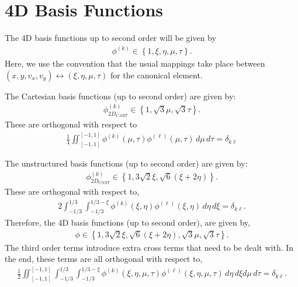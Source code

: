 \documentclass[12pt]{amsart}
\begin{document}
\title{}
\author{}
\date{}
\maketitle

\section{4D Basis Functions}

The 4D basis functions up to second order will be given by
\begin{align}
	\phi^{(k)} \in \left\{	1, \xi, \eta, \mu, \tau \right\}.
\end{align}
Here, we use the convention that the usual mappings take place between
$(x,y,v_x, v_y) \leftrightarrow (\xi, \eta, \mu, \tau )$ for the canonical element.

The Cartesian basis functions (up to second order) are given by:
\begin{align}
	\phi^{(k)}_{2D_{CART}} \in \left\{ 1, \sqrt{3} \mu,  \sqrt{3} \tau \right\}.
\end{align}
These are orthogonal with respect to
\begin{align}
	\frac{1}{4} \iint_{[-1,1]}^{[-1,1]} \phi^{(k)}(\mu,\tau) \phi^{(\ell)}(\mu,\tau)\, d\mu\, d\tau = \delta_{k\ell}
\end{align}

The unstructured basis functions (up to second order) are given by:
\begin{align}
	\phi^{(k)}_{2D_{UNST}} \in \left\{ 1, 3\sqrt{2}\xi, \sqrt{6}\left( \xi + 2\eta \right) \right\}.
\end{align}
These are orthogonal with respect to,
\begin{align}
	2 \int_{-1/3}^{1/3}\int_{-1/3}^{1/3-\xi} \phi^{(k)}(\xi,\eta) \phi^{(\ell)}(\xi,\eta)\, d\eta\, d\xi = \delta_{k\ell}.
\end{align}
Therefore, the 4D basis functions (up to second order), are given by,
\begin{align}
	\phi \in \left\{ 1, 3\sqrt{2}\xi, \sqrt{6}\left( \xi + 2\eta \right), 	 \sqrt{3} \mu,  \sqrt{3} \tau	\right\}.
\end{align}
The third order terms introduce extra cross terms that need to be dealt with.
In the end, these terms are all orthogonal with respect to,
\begin{align}
	\frac{1}{2} \iint_{[-1,1]}^{[-1,1]} \int_{-1/3}^{1/3}\int_{-1/3}^{1/3-\xi} \phi^{(k)}(\xi,\eta, \mu, \tau) \phi^{(\ell)}(\xi,\eta, \mu, \tau)\, d\eta\, d\xi d\mu\, d\tau = \delta_{k\ell}.
\end{align}
\end{document}

